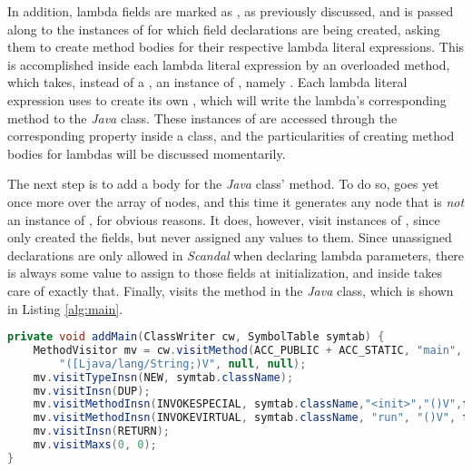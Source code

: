 In addition, lambda fields are marked as , as previously discussed, and  is passed along to the instances of  for which field declarations are being created, asking them to create method bodies for their respective lambda literal expressions. This is accomplished inside each lambda literal expression by an overloaded  method, which takes, instead of a , an instance of , namely . Each lambda literal expression uses  to create its own , which will write the lambda's corresponding method to the \emph{Java} class. These instances of  are accessed through the corresponding  property inside a  class, and the particularities of creating method bodies for lambdas will be discussed momentarily.

The next step is to add a body for the \emph{Java} class'  method. To do so,  goes yet once more over the array of nodes, and this time it generates any node that is \emph{not} an instance of , for obvious reasons. It does, however, visit instances of , since  only created the fields, but never assigned any values to them. Since unassigned declarations are only allowed in \emph{Scandal} when declaring lambda parameters, there is always some value to assign to those fields at initialization, and  inside  takes care of exactly that. Finally,  visits the  method in the \emph{Java} class, which is shown in Listing \ref{alg:main}.

\pagebreak

\begin{lstlisting}[language=Java,caption={Using the ASM framework to construct a \il{main} method.},label={alg:main}]
private void addMain(ClassWriter cw, SymbolTable symtab) {
	MethodVisitor mv = cw.visitMethod(ACC_PUBLIC + ACC_STATIC, "main",
		"([Ljava/lang/String;)V", null, null);
	mv.visitTypeInsn(NEW, symtab.className);
	mv.visitInsn(DUP);
	mv.visitMethodInsn(INVOKESPECIAL, symtab.className,"<init>","()V",false);
	mv.visitMethodInsn(INVOKEVIRTUAL, symtab.className, "run", "()V", false);
	mv.visitInsn(RETURN);
	mv.visitMaxs(0, 0);
}
\end{lstlisting}


